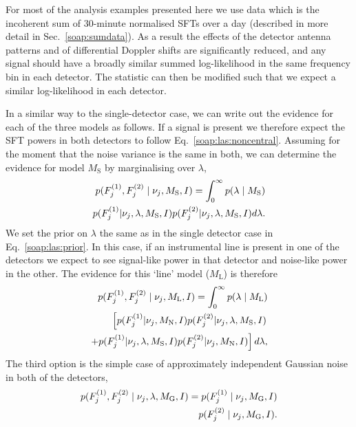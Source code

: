 %
%
For most of the analysis examples presented here we use data which is the incoherent sum of 30-minute normalised \glspl{SFT} over a day (described in more detail in Sec.~\ref{soap:sumdata}). As a result the effects of the detector antenna patterns and of differential Doppler shifts are significantly reduced, and any signal should have a broadly similar summed log-likelihood in the same frequency bin in each detector. The statistic can then be modified such that we expect a similar log-likelihood in each detector.

In a similar way to the single-detector case, we can write out the evidence for each of the three models as follows. If a signal is present we therefore expect the \gls{SFT} powers in both detectors to follow Eq.~\ref{soap:las:noncentral}.  Assuming for the moment that the noise variance is the same in both, we can determine the evidence for model $M_{\text{S}}$ by marginalising over $\lambda$,
%
\begin{equation}
\label{soap:las:signal}
\begin{split}
p(F^{(1)}_{j},F^{(2)}_{j} \mid \nu_j,M_{\rm{S}},I) = \int_0^{\infty}  p(\lambda \mid M_{\rm{S}}) \\
p(F^{(1)}_{j}|\nu_j,\lambda,M_{\text{S}},I)p(F^{(2)}_{j}|\nu_j,\lambda,M_{\text{S}},I) d\lambda.
\end{split}
\end{equation}
%
We set the prior on $\lambda$ the same as in the single detector case in Eq.~\ref{soap:las:prior}.
In this case, if an instrumental line is present in one of the detectors we expect to see signal-like power in that detector and noise-like power in the other.  The evidence for this `line' model ($M_{\text{L}}$) is therefore
%
\begin{equation}
\label{soap:las:line}
\begin{split}
p(F^{(1)}_{j},F^{(2)}_{j} \mid \nu_j,M_{\rm{L}},I) = \int_0^{\infty}  p(\lambda \mid M_{\rm{L}}) \\
\left[ p(F^{(1)}_{j}|\nu_j,M_{\rm{N}},I)p(F^{(2)}_{j}|\nu_j,\lambda,M_{\rm{S}},I) \right. \\
\left. + p(F^{(1)}_{j}|\nu_j,\lambda,M_{\rm{S}},I)p(F^{(2)}_{j}|\nu_j,M_{\rm{N}},I)\right]d\lambda ,
\end{split}
\end{equation}
%
The third option is the simple case of approximately independent Gaussian noise in both of the detectors,
%
\begin{equation}
\label{soap:las:noise}
\begin{split}
p(F^{(1)}_{j},F^{(2)}_{j} \mid \nu_j,\lambda,M_{\rm{G}},I) = p(F^{(1)}_{j} \mid \nu_j,M_{\rm{G}},I) \\
p(F^{(2)}_{j} \mid \nu_j,M_{\rm{G}},I) .
\end{split}
\end{equation}

